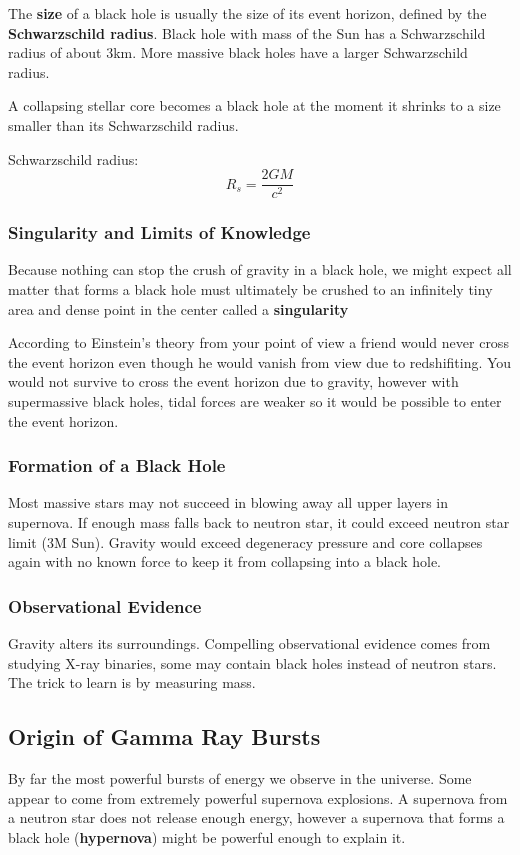 The {\bf size} of a black hole is usually the size of its event horizon, defined by the {\bf Schwarzschild radius}. Black hole with mass of the Sun has a Schwarzschild radius of about 3km. More massive black holes have a larger Schwarzschild radius.

A collapsing stellar core becomes a black hole at the moment it shrinks to a size smaller than its Schwarzschild radius.

Schwarzschild radius: \[ R_s = \frac{2GM}{c^2} \]

\subsubsection{Singularity and Limits of Knowledge}
Because nothing can stop the crush of gravity in a black hole, we might expect all matter that forms a black hole must ultimately be crushed to an infinitely tiny area and dense point in the center called a {\bf singularity}

According to Einstein's theory from your point of view a friend would never cross the event horizon even though he would vanish from view due to redshifiting. You would not survive to cross the event horizon due to gravity, however with supermassive black holes, tidal forces are weaker so it would be possible to enter the event horizon.

\subsubsection{Formation of a Black Hole}

Most massive stars may not succeed in blowing away all upper layers in supernova. If enough mass falls back to neutron star, it could exceed neutron star limit (3M Sun). Gravity would exceed degeneracy pressure and core collapses again with no known force to keep it from collapsing into a black hole.

\subsubsection{Observational Evidence}
Gravity alters its surroundings. Compelling observational evidence comes from studying X-ray binaries, some may contain black holes instead of neutron stars. The trick to learn is by measuring mass.

\subsection{Origin of Gamma Ray Bursts}
By far the most powerful bursts of energy we observe in the universe. Some appear to come from extremely powerful supernova explosions. A supernova from a neutron star does not release enough energy, however a supernova that forms a black hole ({\bf hypernova}) might be powerful enough to explain it.

